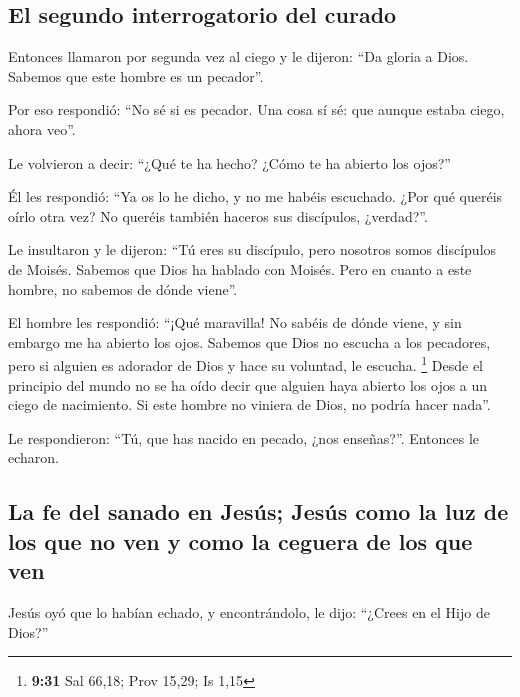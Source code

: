 \hypertarget{el-segundo-interrogatorio-del-curado}{%
\subsection{El segundo interrogatorio del
curado}\label{el-segundo-interrogatorio-del-curado}}

 Entonces llamaron por segunda vez al ciego y le dijeron:
``Da gloria a Dios. Sabemos que este hombre es un pecador''.

 Por eso respondió: ``No sé si es pecador. Una cosa sí
sé: que aunque estaba ciego, ahora veo''.

 Le volvieron a decir: ``¿Qué te ha hecho? ¿Cómo te ha
abierto los ojos?''

 Él les respondió: ``Ya os lo he dicho, y no me habéis
escuchado. ¿Por qué queréis oírlo otra vez? No queréis también haceros
sus discípulos, ¿verdad?''.

 Le insultaron y le dijeron: ``Tú eres su discípulo, pero
nosotros somos discípulos de Moisés.  Sabemos que Dios ha
hablado con Moisés. Pero en cuanto a este hombre, no sabemos de dónde
viene''.

 El hombre les respondió: ``¡Qué maravilla! No sabéis de
dónde viene, y sin embargo me ha abierto los ojos. 
Sabemos que Dios no escucha a los pecadores, pero si alguien es adorador
de Dios y hace su voluntad, le escucha. \footnote{\textbf{9:31} Sal
  66,18; Prov 15,29; Is 1,15}  Desde el principio del
mundo no se ha oído decir que alguien haya abierto los ojos a un ciego
de nacimiento.  Si este hombre no viniera de Dios, no
podría hacer nada''.

 Le respondieron: ``Tú, que has nacido en pecado, ¿nos
enseñas?''. Entonces le echaron.

\hypertarget{la-fe-del-sanado-en-jesuxfas-jesuxfas-como-la-luz-de-los-que-no-ven-y-como-la-ceguera-de-los-que-ven}{%
\subsection{La fe del sanado en Jesús; Jesús como la luz de los que no
ven y como la ceguera de los que
ven}\label{la-fe-del-sanado-en-jesuxfas-jesuxfas-como-la-luz-de-los-que-no-ven-y-como-la-ceguera-de-los-que-ven}}

 Jesús oyó que lo habían echado, y encontrándolo, le
dijo: ``¿Crees en el Hijo de Dios?''

